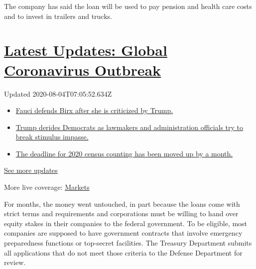 The company has said the loan will be used to pay pension and health
care costs and to invest in trailers and trucks.

\hypertarget{latest-updates-global-coronavirus-outbreak}{%
\section{\texorpdfstring{\href{https://www.nytimes3xbfgragh.onion/2020/08/03/world/coronavirus-covid-19.html?action=click\&pgtype=Article\&state=default\&region=MAIN_CONTENT_1\&context=storylines_live_updates}{Latest
Updates: Global Coronavirus
Outbreak}}{Latest Updates: Global Coronavirus Outbreak}}\label{latest-updates-global-coronavirus-outbreak}}

Updated 2020-08-04T07:05:52.634Z

\begin{itemize}
\tightlist
\item
  \href{https://www.nytimes3xbfgragh.onion/2020/08/03/world/coronavirus-covid-19.html?action=click\&pgtype=Article\&state=default\&region=MAIN_CONTENT_1\&context=storylines_live_updates\#link-4547638f}{Fauci
  defends Birx after she is criticized by Trump.}
\item
  \href{https://www.nytimes3xbfgragh.onion/2020/08/03/world/coronavirus-covid-19.html?action=click\&pgtype=Article\&state=default\&region=MAIN_CONTENT_1\&context=storylines_live_updates\#link-15e7f995}{Trump
  derides Democrats as lawmakers and administration officials try to
  break stimulus impasse.}
\item
  \href{https://www.nytimes3xbfgragh.onion/2020/08/03/world/coronavirus-covid-19.html?action=click\&pgtype=Article\&state=default\&region=MAIN_CONTENT_1\&context=storylines_live_updates\#link-e5a2cda}{The
  deadline for 2020 census counting has been moved up by a month.}
\end{itemize}

\href{https://www.nytimes3xbfgragh.onion/2020/08/03/world/coronavirus-covid-19.html?action=click\&pgtype=Article\&state=default\&region=MAIN_CONTENT_1\&context=storylines_live_updates}{See
more updates}

More live coverage:
\href{https://www.nytimes3xbfgragh.onion/live/2020/08/03/business/stock-market-today-coronavirus?action=click\&pgtype=Article\&state=default\&region=MAIN_CONTENT_1\&context=storylines_live_updates}{Markets}

For months, the money went untouched, in part because the loans come
with strict terms and requirements and corporations must be willing to
hand over equity stakes in their companies to the federal government. To
be eligible, most companies are supposed to have government contracts
that involve emergency preparedness functions or top-secret facilities.
The Treasury Department submits all applications that do not meet those
criteria to the Defense Department for review.

